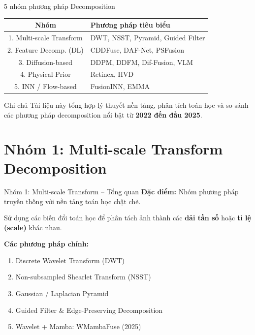\documentclass{beamer}
\begin{document}
\begin{frame}{5 nhóm phương pháp Decomposition}
    \begin{table}
        \centering
        \small
        \renewcommand{\arraystretch}{1.3}
        \begin{tabular}{|c|l|}
            \hline
            \textbf{Nhóm} & \textbf{Phương pháp tiêu biểu} \\ \hline
            1. Multi-scale Transform & DWT, NSST, Pyramid, Guided Filter \\ \hline
            2. Feature Decomp. (DL)  & CDDFuse, DAF-Net, PSFusion \\ \hline
            3. Diffusion-based       & DDPM, DDFM, Dif-Fusion, VLM \\ \hline
            4. Physical-Prior        & Retinex, HVD \\ \hline
            5. INN / Flow-based      & FusionINN, EMMA \\ \hline
        \end{tabular}
    \end{table}

    \vspace{0.3cm}
    \begin{block}{Ghi chú}
        Tài liệu này tổng hợp lý thuyết nền tảng, phân tích toán học và so sánh các phương pháp decomposition nổi bật từ \textbf{2022 đến đầu 2025}.
    \end{block}
\end{frame}

\section{Nhóm 1: Multi-scale Transform Decomposition}

\begin{frame}{Nhóm 1: Multi-scale Transform -- Tổng quan}
    \textbf{Đặc điểm:} Nhóm phương pháp truyền thống với nền tảng toán học chặt chẽ.

    \vspace{0.2cm}
    Sử dụng các biến đổi toán học để phân tách ảnh thành các \textbf{dải tần số} hoặc \textbf{tỉ lệ (scale)} khác nhau.

    \vspace{0.3cm}
    \textbf{Các phương pháp chính:}
    \begin{enumerate}
        \item Discrete Wavelet Transform (DWT)
        \item Non-subsampled Shearlet Transform (NSST)
        \item Gaussian / Laplacian Pyramid
        \item Guided Filter \& Edge-Preserving Decomposition
        \item Wavelet + Mamba: WMambaFuse (2025)
    \end{enumerate}
\end{frame}
\end{document}

